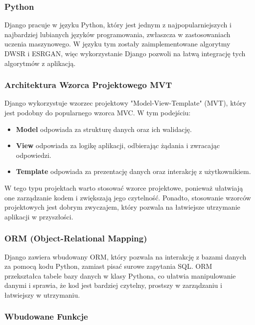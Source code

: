 \subsubsection*{Python}

Django pracuje w języku Python, który jest jednym z najpopularniejszych i najbardziej lubianych języków programowania, zwłaszcza w zastosowaniach uczenia maszynowego. W języku tym zostały zaimplementowane algorytmy DWSR i ESRGAN, więc wykorzystanie Django pozwoli na łatwą integrację tych algorytmów z aplikacją.

\subsubsection*{Architektura Wzorca Projektowego MVT}

Django wykorzystuje wzorzec projektowy "Model-View-Template" (MVT), który jest podobny do popularnego wzorca MVC. W tym podejściu:
\begin{itemize}
    \item \textbf{Model} odpowiada za strukturę danych oraz ich walidację.
    \item \textbf{View} odpowiada za logikę aplikacji, odbierając żądania i zwracając odpowiedzi.
    \item \textbf{Template} odpowiada za prezentację danych oraz interakcję z użytkownikiem.
\end{itemize}

W tego typu projektach warto stosować wzorce projektowe, ponieważ ułatwiają one zarządzanie kodem i zwiększają jego czytelność. Ponadto, stosowanie wzorców projektowych jest dobrym zwyczajem, który pozwala na łatwiejsze utrzymanie aplikacji w przyszłości.

\subsubsection*{ORM (Object-Relational Mapping)}

Django zawiera wbudowany ORM, który pozwala na interakcję z bazami danych za pomocą kodu Python, zamiast pisać surowe zapytania SQL. ORM przekształca tabele bazy danych w klasy Pythona, co ułatwia manipulowanie danymi i sprawia, że kod jest bardziej czytelny, prostszy w zarządzaniu i łatwiejszy w utrzymaniu.

\subsubsection*{Wbudowane Funkcje}

